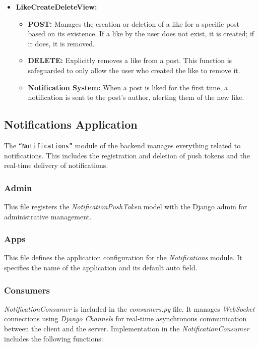\begin{itemize}
    \item \textbf{LikeCreateDeleteView:}
    \begin{itemize}
        \item \textbf{POST:} Manages the creation or deletion of a like for a specific post based on its existence. If a like by the user does not exist, it is created; if it does, it is removed.
        \item \textbf{DELETE:} Explicitly removes a like from a post. This function is safeguarded to only allow the user who created the like to remove it.
        \item \textbf{Notification System:} When a post is liked for the first time, a notification is sent to the post's author, alerting them of the new like.
    \end{itemize}
\end{itemize}

\subsection{Notifications Application}

The \texttt{``Notifications''} module of the backend manages everything related to notifications. This includes the registration and deletion of push tokens and the real-time delivery of notifications.

\subsubsection{Admin} 

This file registers the \textit{NotificationPushToken} model with the Django admin for administrative management.

\subsubsection{Apps} 

This file defines the application configuration for the \textit{Notifications} module. It specifies the name of the application and its default auto field.

\subsubsection{Consumers}

\textit{NotificationConsumer} is included in the \textit{consumers.py} file. It manages \textit{WebSocket} connections using \textit{Django Channels} for real-time asynchronous communication between the client and the server. Implementation in the \textit{NotificationConsumer} includes the following functions:

